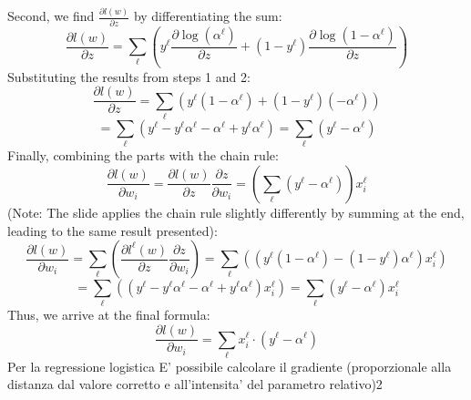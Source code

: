 {    Second, we find $\frac{\partial l(w)}{\partial z}$ by differentiating the sum:
    \[
        \frac{\partial l(w)}{\partial z} = \sum_\ell \left( y^\ell \frac{\partial \log(\alpha^\ell)}{\partial z} + (1-y^\ell) \frac{\partial \log(1-\alpha^\ell)}{\partial z} \right)
    \]
    Substituting the results from steps 1 and 2:
    \[
        \frac{\partial l(w)}{\partial z} = \sum_\ell \left( y^\ell (1 - \alpha^\ell) + (1-y^\ell) (-\alpha^\ell) \right)
    \]
    \[
        = \sum_\ell ( y^\ell - y^\ell\alpha^\ell - \alpha^\ell + y^\ell\alpha^\ell ) = \sum_\ell (y^\ell - \alpha^\ell)
    \]
    Finally, combining the parts with the chain rule:
    \[
        \frac{\partial l(w)}{\partial w_i} = \frac{\partial l(w)}{\partial z} \frac{\partial z}{\partial w_i} = \left( \sum_\ell (y^\ell - \alpha^\ell) \right) x_i^\ell
    \]
    (Note: The slide applies the chain rule slightly differently by summing at the end, leading to the same result presented):
    \[
        \frac{\partial l(w)}{\partial w_i} = \sum_\ell \left( \frac{\partial l^\ell(w)}{\partial z} \frac{\partial z}{\partial w_i} \right) = \sum_\ell \left( (y^\ell(1-\alpha^\ell) - (1-y^\ell)\alpha^\ell) x_i^\ell \right)
    \]
    \[
        = \sum_\ell ( (y^\ell - y^\ell\alpha^\ell - \alpha^\ell + y^\ell\alpha^\ell) x_i^\ell ) = \sum_\ell (y^\ell - \alpha^\ell) x_i^\ell
    \]
    Thus, we arrive at the final formula:
    \[
        \frac{\partial l(w)}{\partial w_i} = \sum_\ell x_i^\ell \cdot (y^\ell - \alpha^\ell)
    \]
}
Per la regressione logistica
E' possibile calcolare il gradiente (proporzionale alla distanza dal valore corretto e all'intensita' del parametro relativo)2

